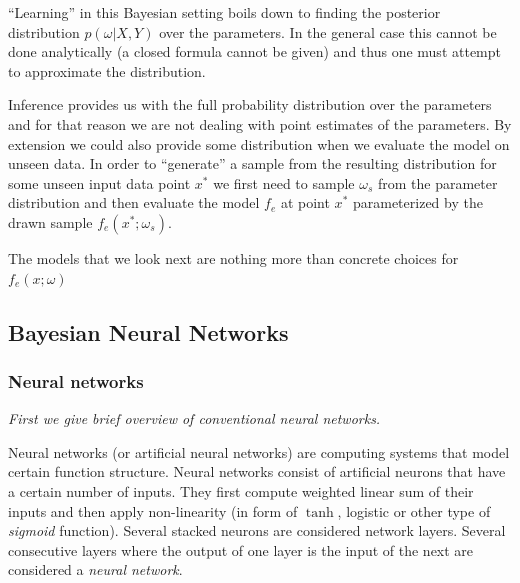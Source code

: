 \documentclass[12pt,a4paper,twoside]{scrartcl}
\numberwithin{equation}{section}
\begin{document}
``Learning'' in this Bayesian setting boils down to finding the posterior distribution \(p(\omega |X, Y)\) over the parameters. In the general case this cannot be done analytically (a closed formula cannot be given) and thus one must attempt to approximate the distribution.

Inference provides us with the full probability distribution over the parameters and for that reason we are not dealing with point estimates of the parameters. By extension we could also provide some distribution when we evaluate the model on unseen data. In order to ``generate'' a sample from the resulting distribution for some unseen input data point \(x^*\) we first need to sample \(\omega_s\) from the parameter distribution and then evaluate the model \(f_e\) at point \(x^*\) parameterized by the drawn sample  \(f_e(x^*; \omega_s)\).

The models that we look next are nothing more than concrete choices for \(f_e(x;\omega)\)
\subsection{Bayesian Neural Networks}
\label{sec:bnn}
\subsubsection{Neural networks}\label{sec:nn}
\noindent\emph{First we give brief overview of conventional neural networks.}

Neural networks (or artificial neural networks) are computing systems that model certain function structure. Neural networks consist of artificial neurons that have a certain number of inputs. They first compute weighted linear sum of their inputs and then apply non-linearity (in form of \(\tanh\), logistic or other type of \emph{sigmoid} function). Several stacked neurons are considered network layers. Several consecutive layers where the output of one layer is the input of the next are considered a \emph{neural network}.
\end{document}
